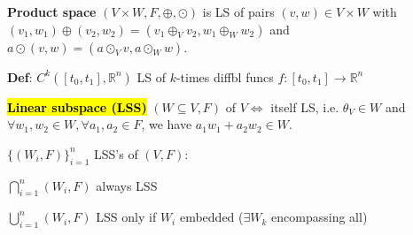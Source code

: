 \begin{Definition}
\textbf{Product space} $(V\times W,F,\oplus,\odot)$ is LS of pairs $(v,w)\in V\times W$ with $(v_1,w_1)\oplus(v_2,w_2)=(v_1\oplus_V v_2,w_1\oplus_W w_2)$ and $a\odot(v,w)=(a\odot_V v,a\odot_W w)$.
\end{Definition}
\textbf{Def}: $C^k([t_0,t_1],\mathbb R^n)$ LS of $k$-times diffbl funcs $f:[t_0,t_1]\to\mathbb R^n$

\begin{Definition}
\textbf{\hl{Linear subspace (LSS)}} $(W\subseteq V,F)$ of $V\Leftrightarrow$ itself LS, i.e. $\theta_V\in W$ and $\forall w_1,w_2\in W,\forall a_1,a_2\in F$, we have $a_1 w_1+a_2 w_2\in W$.
\end{Definition}
$\{(W_i,F)\}_{i=1}^n$ LSS's of $(V,F)$:
\begin{itemize*}
  \item $\bigcap_{i=1}^n (W_i,F)$ always LSS
  \item $\bigcup_{i=1}^n (W_i,F)$ LSS only if $W_i$ embedded ($\exists W_k$ encompassing all)
\end{itemize*}

